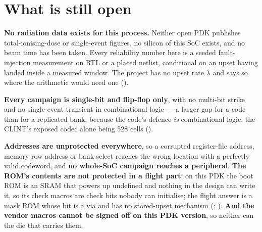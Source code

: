 \section{What is still open}
\label{sec:harden-open}

\textbf{No radiation data exists for this process.} Neither open PDK
publishes total-ionising-dose or single-event figures, no silicon of
this SoC exists, and no beam time has been taken. Every reliability
number here is a seeded fault-injection measurement on RTL or a placed
netlist, conditional on an upset having landed inside a measured window.
The project has no upset rate $\lambda$ and says so where the arithmetic
would need one ().

\textbf{Every campaign is single-bit and flip-flop only}, with no
multi-bit strike and no single-event transient in combinational logic
--- a larger gap for a code than for a replicated bank, because the
code's defence \emph{is} combinational logic, the CLINT's exposed codec
alone being 528 cells ().

\textbf{Addresses are unprotected everywhere}, so a corrupted
register-file address, memory row address or bank select reaches the
wrong location with a perfectly valid codeword, and \textbf{no whole-SoC
campaign reaches a peripheral}. \textbf{The ROM's contents are not
protected in a flight part}: on this PDK the boot ROM is an SRAM that
powers up undefined and nothing in the design can write it, so its check
macros are check bits nobody can initialise; the flight answer is a mask
ROM whose bit is a via and has no stored-upset mechanism
(; ). \textbf{And the vendor
macros cannot be signed off on this PDK version}, so neither can the die
that carries them.
